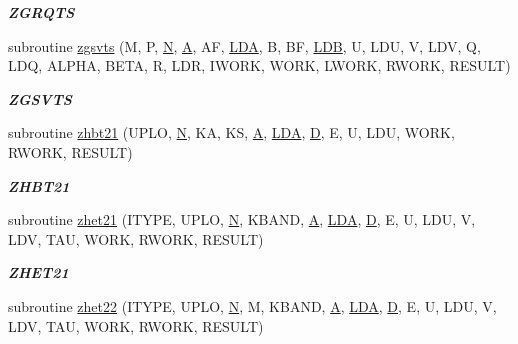 \begin{DoxyCompactItemize}
\begin{DoxyCompactList}\small\item\em {\bfseries Z\+G\+R\+Q\+T\+S} \end{DoxyCompactList}\item 
subroutine \hyperlink{group__complex16__eig_ga13b64eda7bfa37b59a8daa81990c42c8}{zgsvts} (M, P, \hyperlink{polmisc_8c_a0240ac851181b84ac374872dc5434ee4}{N}, \hyperlink{classA}{A}, A\+F, \hyperlink{example__user_8c_ae946da542ce0db94dced19b2ecefd1aa}{L\+D\+A}, B, B\+F, \hyperlink{example__user_8c_a50e90a7104df172b5a89a06c47fcca04}{L\+D\+B}, U, L\+D\+U, V, L\+D\+V, Q, L\+D\+Q, A\+L\+P\+H\+A, B\+E\+T\+A, R, L\+D\+R, I\+W\+O\+R\+K, W\+O\+R\+K, L\+W\+O\+R\+K, R\+W\+O\+R\+K, R\+E\+S\+U\+L\+T)
\begin{DoxyCompactList}\small\item\em {\bfseries Z\+G\+S\+V\+T\+S} \end{DoxyCompactList}\item 
subroutine \hyperlink{group__complex16__eig_gaa47ecbf426a7802083f1a164e1525005}{zhbt21} (U\+P\+L\+O, \hyperlink{polmisc_8c_a0240ac851181b84ac374872dc5434ee4}{N}, K\+A, K\+S, \hyperlink{classA}{A}, \hyperlink{example__user_8c_ae946da542ce0db94dced19b2ecefd1aa}{L\+D\+A}, \hyperlink{odrpack_8h_a7dae6ea403d00f3687f24a874e67d139}{D}, E, U, L\+D\+U, W\+O\+R\+K, R\+W\+O\+R\+K, R\+E\+S\+U\+L\+T)
\begin{DoxyCompactList}\small\item\em {\bfseries Z\+H\+B\+T21} \end{DoxyCompactList}\item 
subroutine \hyperlink{group__complex16__eig_gab79dcd8016959527ea3d7137912e932d}{zhet21} (I\+T\+Y\+P\+E, U\+P\+L\+O, \hyperlink{polmisc_8c_a0240ac851181b84ac374872dc5434ee4}{N}, K\+B\+A\+N\+D, \hyperlink{classA}{A}, \hyperlink{example__user_8c_ae946da542ce0db94dced19b2ecefd1aa}{L\+D\+A}, \hyperlink{odrpack_8h_a7dae6ea403d00f3687f24a874e67d139}{D}, E, U, L\+D\+U, V, L\+D\+V, T\+A\+U, W\+O\+R\+K, R\+W\+O\+R\+K, R\+E\+S\+U\+L\+T)
\begin{DoxyCompactList}\small\item\em {\bfseries Z\+H\+E\+T21} \end{DoxyCompactList}\item 
subroutine \hyperlink{group__complex16__eig_gaf5ac8f81c63bc01215d2523af67f0a9f}{zhet22} (I\+T\+Y\+P\+E, U\+P\+L\+O, \hyperlink{polmisc_8c_a0240ac851181b84ac374872dc5434ee4}{N}, M, K\+B\+A\+N\+D, \hyperlink{classA}{A}, \hyperlink{example__user_8c_ae946da542ce0db94dced19b2ecefd1aa}{L\+D\+A}, \hyperlink{odrpack_8h_a7dae6ea403d00f3687f24a874e67d139}{D}, E, U, L\+D\+U, V, L\+D\+V, T\+A\+U, W\+O\+R\+K, R\+W\+O\+R\+K, R\+E\+S\+U\+L\+T)

\end{DoxyCompactItemize}
